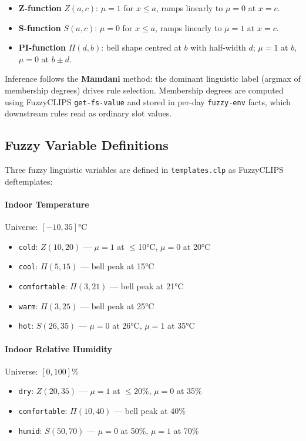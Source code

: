 \documentclass{article}
\begin{document}
\begin{itemize}
    \item \textbf{Z-function} $Z(a, c)$: $\mu = 1$ for $x \leq a$, ramps linearly to $\mu = 0$ at $x = c$.
    \item \textbf{S-function} $S(a, c)$: $\mu = 0$ for $x \leq a$, ramps linearly to $\mu = 1$ at $x = c$.
    \item \textbf{PI-function} $\Pi(d, b)$: bell shape centred at $b$ with half-width $d$; $\mu = 1$ at $b$, $\mu = 0$ at $b \pm d$.
\end{itemize}

Inference follows the \textbf{Mamdani} method: the dominant linguistic label (argmax of membership degrees) drives rule selection. Membership degrees are computed using FuzzyCLIPS \texttt{get-fs-value} and stored in per-day \texttt{fuzzy-env} facts, which downstream rules read as ordinary slot values.

\subsection{Fuzzy Variable Definitions}

Three fuzzy linguistic variables are defined in \texttt{templates.clp} as FuzzyCLIPS deftemplates:

\paragraph{Indoor Temperature} Universe: $[-10, 35]$°C
\begin{itemize}
    \item \texttt{cold}: $Z(10, 20)$ — $\mu=1$ at $\leq$10°C, $\mu=0$ at 20°C
    \item \texttt{cool}: $\Pi(5, 15)$ — bell peak at 15°C
    \item \texttt{comfortable}: $\Pi(3, 21)$ — bell peak at 21°C
    \item \texttt{warm}: $\Pi(3, 25)$ — bell peak at 25°C
    \item \texttt{hot}: $S(26, 35)$ — $\mu=0$ at 26°C, $\mu=1$ at 35°C
\end{itemize}

\paragraph{Indoor Relative Humidity} Universe: $[0, 100]$\%
\begin{itemize}
    \item \texttt{dry}: $Z(20, 35)$ — $\mu=1$ at $\leq$20\%, $\mu=0$ at 35\%
    \item \texttt{comfortable}: $\Pi(10, 40)$ — bell peak at 40\%
    \item \texttt{humid}: $S(50, 70)$ — $\mu=0$ at 50\%, $\mu=1$ at 70\%
\end{itemize}
\end{document}
